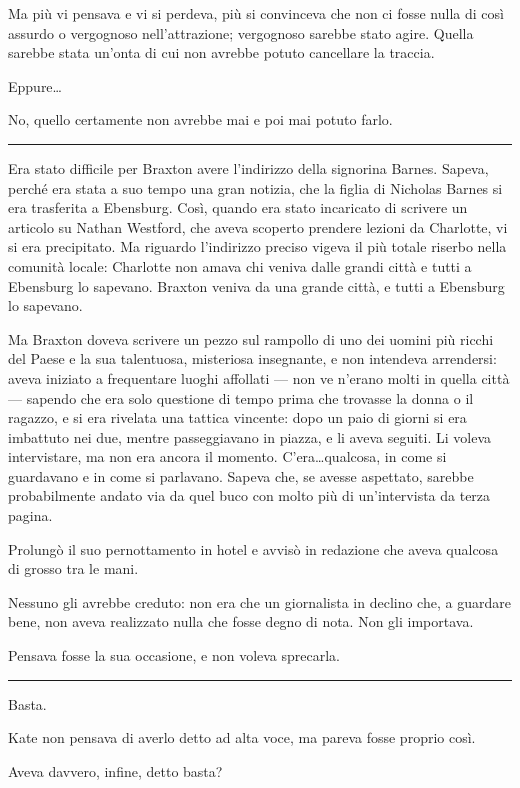 Ma più vi pensava e vi si perdeva, più si convinceva che non ci fosse nulla di così assurdo o
vergognoso nell'attrazione; vergognoso sarebbe stato agire. Quella sarebbe stata un'onta di cui non
avrebbe potuto cancellare la traccia.

Eppure\dots

No, quello certamente non avrebbe mai e poi mai potuto farlo.

\plainbreak{1}

Era stato difficile per Braxton avere l'indirizzo della signorina Barnes. Sapeva, perché era stata a
suo tempo una gran notizia, che la figlia di Nicholas Barnes si era trasferita a Ebensburg. Così,
quando era stato incaricato di scrivere un articolo su Nathan Westford, che aveva scoperto prendere
lezioni da Charlotte, vi si era precipitato. Ma riguardo l'indirizzo preciso vigeva il più totale
riserbo nella comunità locale: Charlotte non amava chi veniva dalle grandi città e tutti a Ebensburg
lo sapevano. Braxton veniva da una grande città, e tutti a Ebensburg lo sapevano.

Ma Braxton doveva scrivere un pezzo sul rampollo di uno dei uomini più ricchi del Paese e la sua
talentuosa, misteriosa insegnante, e non intendeva arrendersi: aveva iniziato a frequentare luoghi
affollati — non ve n'erano molti in quella città — sapendo che era solo questione di tempo prima che
trovasse la donna o il ragazzo, e si era rivelata una tattica vincente: dopo un paio di giorni si
era imbattuto nei due, mentre passeggiavano in piazza, e li aveva seguiti. Li voleva intervistare,
ma non era ancora il momento. C'era\dots qualcosa, in come si guardavano e in come si parlavano.
Sapeva che, se avesse aspettato, sarebbe probabilmente andato via da quel buco con molto più di
un'intervista da terza pagina.

Prolungò il suo pernottamento in hotel e avvisò in redazione che aveva qualcosa di grosso tra le
mani.

Nessuno gli avrebbe creduto: non era che un giornalista in declino che, a guardare bene, non aveva
realizzato nulla che fosse degno di nota. Non gli importava.

Pensava fosse la sua occasione, e non voleva sprecarla.

\plainbreak{1}

Basta.

Kate non pensava di averlo detto ad alta voce, ma pareva fosse proprio così.

Aveva davvero, infine, detto basta?

